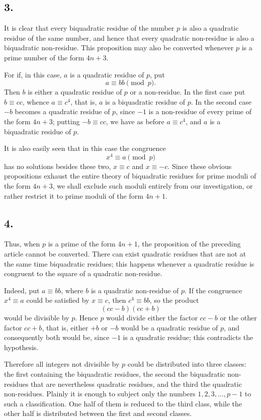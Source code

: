 \documentclass[12pt]{article}
\begin{document}
\subsection*{3.}

It is clear that every biquadratic residue of the number $p$ is also a quadratic residue of the same number, and hence that every quadratic non-residue is also a biquadratic non-residue. This proposition may also be converted whenever $p$ is a prime number of the form $4n+3$.

For if, in this case, $a$ is a quadratic residue of $p$, put
\[
a\equiv bb \pmod p.
\]
Then $b$ is either a quadratic residue of $p$ or a non-residue. In the first case put $b\equiv cc$, whence $a\equiv c^4$, that is, $a$ is a biquadratic residue of $p$. In the second case $-b$ becomes a quadratic residue of $p$, since $-1$ is a non-residue of every prime of the form $4n+3$; putting $-b\equiv cc$, we have as before $a\equiv c^4$, and $a$ is a biquadratic residue of $p$.

It is also easily seen that in this case the congruence
\[
x^4\equiv a\pmod p
\]
has no solutions besides these two, $x\equiv c$ and $x\equiv -c$. Since these obvious propositions exhaust the entire theory of biquadratic residues for prime moduli of the form $4n+3$, we shall exclude such moduli entirely from our investigation, or rather restrict it to prime moduli of the form $4n+1$.

\subsection*{4.}

Thus, when $p$ is a prime of the form $4n+1$, the proposition of the preceding article cannot be converted. There can exist quadratic residues that are not at the same time biquadratic residues; this happens whenever a quadratic residue is congruent to the square of a quadratic non-residue.

Indeed, put $a\equiv bb$, where $b$ is a quadratic non-residue of $p$. If the congruence $x^4\equiv a$ could be satisfied by $x\equiv c$, then $c^4\equiv bb$, so the product
\[
(cc-b)(cc+b)
\]
would be divisible by $p$. Hence $p$ would divide either the factor $cc-b$ or the other factor $cc+b$, that is, either $+b$ or $-b$ would be a quadratic residue of $p$, and consequently both would be, since $-1$ is a quadratic residue; this contradicts the hypothesis.

Therefore all integers not divisible by $p$ could be distributed into three classes: the first containing the biquadratic residues, the second the biquadratic non-residues that are nevertheless quadratic residues, and the third the quadratic non-residues. Plainly it is enough to subject only the numbers $1,2,3,\ldots,p-1$ to such a classification. One half of them is reduced to the third class, while the other half is distributed between the first and second classes.
\end{document}
